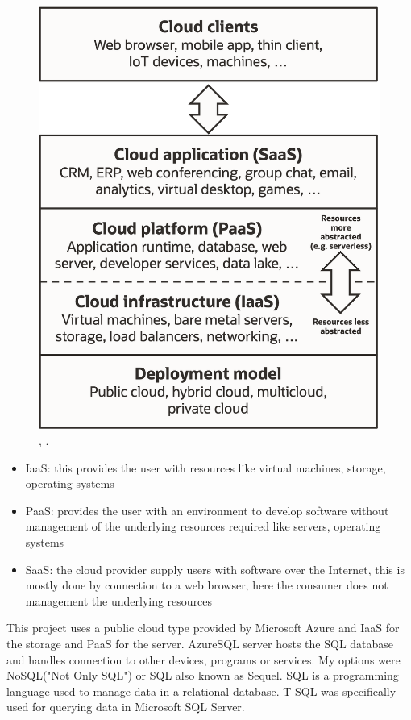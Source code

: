 \begin{figure}[h]
\centering
\includegraphics[scale=0.8]{Background/images/Cloud_computing_service_models_(1).png}
\caption{\citeauthor{FileClou30:online}, \citeyear{FileClou30:online}. }
\end{figure}
\begin{itemize}
  \item \gls{IaaS}: this provides the user with resources like virtual machines, storage, operating systems
  \item \gls{PaaS}: provides the user with an environment to develop software without management of the underlying resources required like servers, operating systems
  \item \gls{SaaS}: the cloud provider supply users with software over the Internet, this is mostly done by connection to a web browser, here the consumer does not management the underlying resources
\end{itemize}
This project uses a public cloud type provided by Microsoft Azure and \gls{IaaS} for the storage and \gls{PaaS} for the server. AzureSQL server hosts the SQL database and handles connection to other devices, programs or services.
My options were NoSQL("Not Only SQL") or SQL also known as Sequel.
SQL is a programming language used to manage data in a relational database. T-SQL was specifically used for querying data in Microsoft SQL Server.




